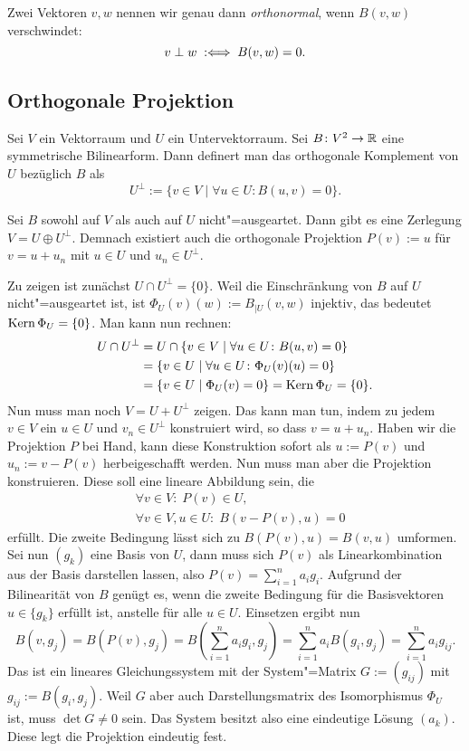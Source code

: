 Zwei Vektoren $v,w$ nennen wir genau dann \emph{orthonormal},
wenn $B(v,w)$ verschwindet:%
\begin{equation}
v\perp w \;:\Longleftrightarrow\; B(v,w)=0.
\end{equation}

\subsection{Orthogonale Projektion}

Sei $V$ ein Vektorraum und $U$ ein Untervektorraum. Sei
$B\colon V^2\to\mathbb R$ eine symmetrische Bilinearform. Dann definert
man das orthogonale Komplement
von $U$ bezüglich $B$ als
\begin{equation}
U^\perp := \{v\in V\mid \forall u\in U\colon B(u,v)=0\}.
\end{equation}
\begin{theorem}
Sei $B$ sowohl auf $V$ als auch auf $U$ nicht"=ausgeartet.
Dann gibt es eine Zerlegung $V=U\oplus U^\perp$. Demnach
existiert auch die orthogonale Projektion $P(v):=u$
für $v=u+u_n$ mit $u\in U$ und $u_n\in U^\perp$.
\end{theorem}
 Zu zeigen ist zunächst $U\cap U^\perp=\{0\}$.
Weil die Einschränkung von $B$ auf $U$ nicht"=ausgeartet ist, ist
$\Phi_U(v)(w):=B_{|U}(v,w)$ injektiv, das bedeutet
$\operatorname{Kern}\Phi_U=\{0\}$. Man kann nun rechnen:
\begin{align}
U\cap U^\perp &= U\cap\{v\in V\mid \forall u\in U\colon B(u,v)=0\}\\
&= \{v\in U\mid\forall u\in U\colon\Phi_U(v)(u)=0\}\\
&= \{v\in U\mid \Phi_U(v)=0\} = \operatorname{Kern}\Phi_U = \{0\}.
\end{align}
Nun muss man noch $V=U+U^\perp$ zeigen. Das kann man tun, indem
zu jedem $v\in V$ ein $u\in U$ und $v_n\in U^\perp$ konstruiert
wird, so dass $v=u+u_n$. Haben wir die Projektion $P$ bei Hand,
kann diese Konstruktion sofort als $u:=P(v)$ und $u_n:=v-P(v)$
herbeigeschafft werden. Nun muss man aber die Projektion
konstruieren. Diese soll eine lineare Abbildung sein, die%
\begin{align}
&\forall v\in V\colon\; P(v)\in U,\\
&\forall v\in V, u\in U\colon\; B(v-P(v),u) = 0
\end{align}
erfüllt. Die zweite Bedingung lässt sich zu $B(P(v),u)=B(v,u)$
umformen. Sei nun $(g_k)$ eine Basis von $U$, dann muss sich
$P(v)$ als Linearkombination aus der Basis darstellen lassen,
also $P(v)=\sum_{i=1}^n a_i g_i$. Aufgrund der Bilinearität von $B$
genügt es, wenn die zweite Bedingung für die Basisvektoren
$u\in\{g_k\}$ erfüllt ist, anstelle für alle $u\in U$. Einsetzen
ergibt nun
\begin{equation}
B(v,g_j) = B(P(v),g_j) = B(\sum_{i=1}^n a_i g_i,g_j)
= \sum_{i=1}^n a_i B(g_i,g_j) = \sum_{i=1}^n a_i g_{ij}.
\end{equation}
Das ist ein lineares Gleichungssystem mit der System"=Matrix
$G:=(g_{ij})$ mit $g_{ij}:=B(g_i,g_j)$. Weil $G$ aber auch
Darstellungsmatrix des Isomorphismus $\Phi_U$ ist, muss $\det G\ne 0$
sein. Das System besitzt also eine eindeutige Lösung $(a_k)$. Diese
legt die Projektion eindeutig fest.\;\qedsymbol



